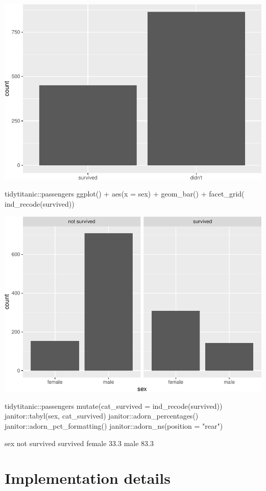 \begin{Schunk}
\includegraphics[width=0.69\linewidth]{r_journal_files/figure-latex/unnamed-chunk-9-3} \begin{Sinput}
tidytitanic::passengers %
ggplot() + 
  aes(x = sex) + 
  geom_bar() + 
  facet_grid(~ ind_recode(survived))
\end{Sinput}

\includegraphics[width=0.69\linewidth]{r_journal_files/figure-latex/unnamed-chunk-9-4} \begin{Sinput}
tidytitanic::passengers %
  mutate(cat_survived = ind_recode(survived)) %
  janitor::tabyl(sex, cat_survived) %
  janitor::adorn_percentages() %
  janitor::adorn_pct_formatting() %
  janitor::adorn_ns(position = "rear")
\end{Sinput}
\begin{Soutput}
         sex not survived    survived
      female  33.3%
        male  83.3%
\end{Soutput}
\end{Schunk}

\hypertarget{implementation-details}{%
\section{Implementation details}\label{implementation-details}}

